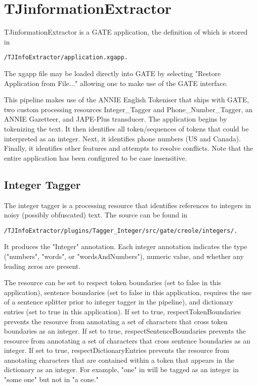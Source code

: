 \documentclass{article}
\begin{document}
\section{{TJinformationExtractor}}

{TJinformationExtractor} is a {GATE} application, the definition of which is
stored in 
\begin{lstlisting}[style=Bash]
/TJInfoExtractor/application.xgapp.
\end{lstlisting} The xgapp file may be loaded directly into {GATE} by selecting
"{Restore Application from File...}" allowing one to make use of the {GATE} interface.

This pipeline makes use of 
the {ANNIE} {E}nglish {T}okeniser that ships with {GATE}, two custom processing
resources {I}nteger\_{T}agger and {P}hone\_{N}umber\_{T}agger, an {ANNIE} {G}azetteer,
and {JAPE}-{P}lus transducer. The application begins by tokenizing the text. It then
identifies all token/sequences of tokens that could be interpreted as an integer. Next, it
identifies phone numbers ({US} and {C}anada). Finally, it identifies other features
and attempts to resolve conflicts. Note that the entire application has been configured to 
be case insensitive.

\subsection{{Integer Tagger}}
The integer tagger is a processing resource that identifies references to integers
in noisy (possibly obfuscated) text. The source can be found in 
\begin{lstlisting}[style=Bash]
/TJInfoExtractor/plugins/Tagger_Integer/src/gate/creole/integers/.
\end{lstlisting} It produces the "Integer" annotation. Each integer
annotation indicates the type ("numbers", "words", or "wordsAndNumbers"), numeric value, and
whether any leading zeros are present. 

The resource can be set to respect token boundaries (set to false in this application), 
sentence boundaries (set to false in this application, requires the use of a sentence splitter prior
to integer tagger in the pipeline), and dictionary entries (set to true in this application). If set to true, {respectTokenBoundaries} 
prevents the resource from annotating a set of characters that cross
token boundaries as an integer. If set to true, {respectSentenceBoundaries} prevents the resource
from annotating a set of characters that cross sentence boundaries as an integer. If set to true, respectDictionaryEntries 
prevents the resource from annotating characters that are contained within a token that appears in the dictionary as an integer. 
For example, "one" in will be tagged as an integer in "some one" but not in "a cone." 
\end{document}
